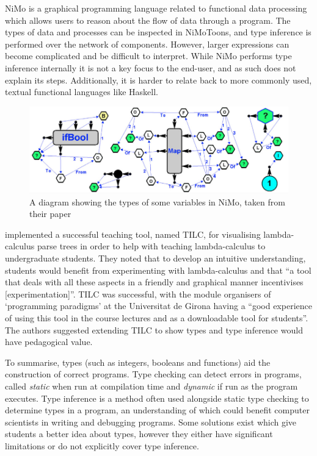 \documentclass[a4paper,fleqn,12pt]{article}
\begin{document}
NiMo \citep{ref8} is a graphical programming language related to functional data processing which allows users to reason about the flow of data through a program. The types of data and processes can be inspected in NiMoToons, and type inference is performed over the network of components. However, larger expressions can become complicated and be difficult to interpret. While NiMo performs type inference internally it is not a key focus to the end-user, and as such does not explain its steps. Additionally, it is harder to relate back to more commonly used, textual functional languages like Haskell.

{\centering \begin{figure}[h!]
  \centering
  \includegraphics[width=0.960\linewidth]{images/image3.png}
  \caption{A diagram showing the types of some variables in NiMo, taken from their paper}
\end{figure} \par}

\cite{ref9} implemented a successful teaching tool, named TILC, for visualising lambda-calculus parse trees in order to help with teaching lambda-calculus to undergraduate students. They noted that to develop an intuitive understanding, students would benefit from  experimenting with lambda-calculus and that “a tool that deals with all these aspects in a friendly and graphical manner incentivises [experimentation]”. TILC was successful, with the module organisers of ‘programming paradigms’ at the Universitat de Girona having a “good experience of using this tool in the course lectures and as a downloadable tool for students”. The authors suggested extending TILC to show types and type inference would have pedagogical value.

To summarise, types (such as integers, booleans and functions) aid the construction of correct programs. Type checking can detect errors in programs, called \textit{static} when run at compilation time and \textit{dynamic} if run as the program executes. Type inference is a method often used alongside static type checking to determine types in a program, an understanding of which could benefit computer scientists in writing and debugging programs. Some solutions exist which give students a better idea about types, however they either have significant limitations or do not explicitly cover type inference.
\end{document}
